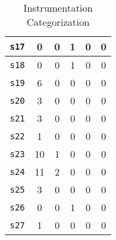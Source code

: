 \begin{table}[t]
{\begin{tabular}{l c c c c c }
	{\tt s17}&
	0 & 0 & 1 & 0 & 0
	\\ \midrule
	
	{\tt s18}&
	0 & 0 & 1 & 0 & 0
	\\ \midrule
	
	{\tt s19}&
	6 & 0 & 0 & 0 & 0
	\\ \midrule
	
	{\tt s20}&
	3 & 0 & 0 & 0 & 0
    \\ \midrule	
		
	{\tt s21}&
	3 & 0 & 0 & 0 & 0
	\\ \midrule	
		
	{\tt s22}&
	1 & 0 & 0 & 0 & 0
	\\ \midrule	
		
	{\tt s23}&
	10 & 1 & 0 & 0 & 0
	\\ \midrule
		
	{\tt s24}&
	11	& 2 & 0	& 0 & 0
	\\ \midrule
	
	{\tt s25}&
	3 & 0 & 0 & 0 & 0
	\\ \midrule
	
	{\tt s26}&
	0 & 0 & 1 & 0 & 0
	\\ \midrule
		
	{\tt s27}&
	1 & 0 & 0 & 0 & 0
	\\ \bottomrule

\end{tabular}
}
\caption{Instrumentation Categorization}
\label{table:InstruCategorization}
\vspace{-1em}
\end{table}
